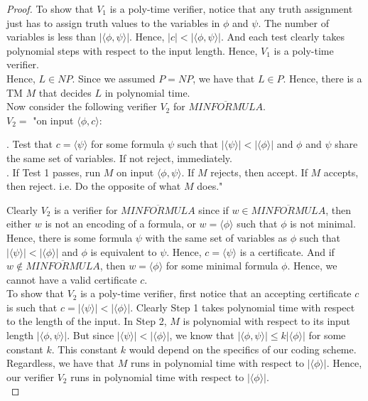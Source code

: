 \documentclass[12pt]{article}
\begin{document}
\begin{proof}
To show that $V_1$ is a poly-time verifier, notice that any truth assignment just has to assign truth values to the variables in $\phi$ and $\psi$. The number of variables is less than $|\langle \phi, \psi \rangle|$. Hence, $|c| < |\langle \phi, \psi \rangle|$. And each test clearly takes polynomial steps with respect to the input length. Hence, $V_1$ is a poly-time verifier.  \\

Hence, $L \in NP$. Since we assumed $P = NP$, we have that $L \in P$. Hence, there is a TM $M$ that decides $L$ in polynomial time. \\

Now consider the following verifier $V_2$ for $\overline{MINFORMULA}$. \\

$V_2 = $ "on input $\langle \phi, c \rangle$: \\

\setlength\parindent{15pt}

. Test that $c = \langle \psi \rangle$ for some formula $\psi$ such that $|\langle \psi \rangle| < |\langle \phi \rangle|$ and $\phi$ and $\psi$ share the same set of variables. If not reject, immediately. \\

. If Test 1 passes, run $M$ on input $\langle \phi, \psi \rangle$. If $M$ rejects, then accept. If $M$ accepts, then reject. i.e. Do the opposite of what $M$ does." \\
\setlength\parindent{0pt}

Clearly $V_2$ is a verifier for $\overline{MINFORMULA}$ since if $w \in \overline{MINFORMULA}$, then either $w$ is not an encoding of a formula, or $w = \langle \phi \rangle$ such that $\phi$ is not minimal. Hence, there is some formula $\psi$ with the same set of variables as $\phi$ such that $|\langle \psi \rangle| < |\langle \phi \rangle|$ and $\phi$ is equivalent to $\psi$. Hence, $c = \langle \psi \rangle$ is a certificate. And if $w \not \in \overline{MINFORMULA}$, then $w = \langle \phi \rangle$ for some minimal formula $\phi$. Hence, we cannot have a valid certificate $c$. \\

To show that $V_2$ is a poly-time verifier, first notice that an accepting certificate $c$ is such that $c = |\langle \psi \rangle| < |\langle \phi \rangle|$. Clearly Step 1 takes polynomial time with respect to the length of the input. In Step 2, $M$ is polynomial with respect to its input length $|\langle \phi, \psi \rangle|$. But since $|\langle \psi \rangle| < |\langle \phi \rangle|$, we know that $|\langle \phi, \psi \rangle| \leq k|\langle \phi \rangle|$ for some constant $k$. This constant $k$ would depend on the specifics of our coding scheme. Regardless, we have that $M$ runs in polynomial time with respect to $|\langle \phi \rangle|$. Hence, our verifier $V_2$ runs in polynomial time with respect to $|\langle \phi \rangle|$. \\


\end{proof}
\end{document}
